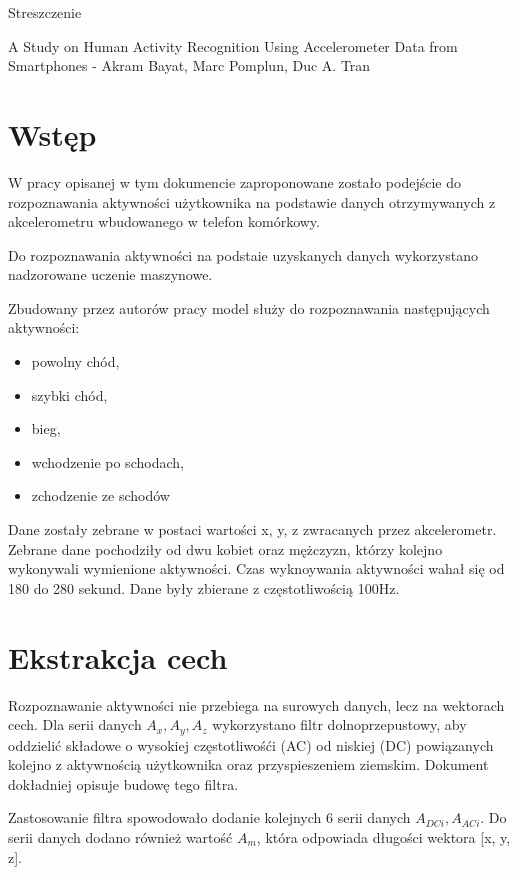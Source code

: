 \documentclass{article}
\begin{document}
\begin{center}
	\LARGE Streszczenie
\end{center}
\begin{center}
	{\Large A Study on Human Activity Recognition Using Accelerometer Data
		from Smartphones - Akram Bayat, Marc Pomplun, Duc A. Tran}
\end{center}

\section{Wstęp}
W pracy opisanej w tym dokumencie zaproponowane zostało podejście do rozpoznawania aktywności użytkownika
na podstawie danych otrzymywanych z akcelerometru wbudowanego w telefon komórkowy.

Do rozpoznawania aktywności na podstaie uzyskanych danych wykorzystano nadzorowane uczenie maszynowe.

Zbudowany przez autorów pracy model służy do rozpoznawania następujących aktywności:
\begin{itemize}
	\item powolny chód,
	\item szybki chód,
	\item bieg,
	\item wchodzenie po schodach,
	\item zchodzenie ze schodów
\end{itemize}

Dane zostały zebrane w postaci wartości x, y, z zwracanych przez akcelerometr.
Zebrane dane pochodziły od dwu kobiet oraz mężczyzn, którzy kolejno wykonywali wymienione aktywności. Czas wyknoywania aktywności wahał się od 180 do 280 sekund. Dane były zbierane z częstotliwością 100Hz.

\section{Ekstrakcja cech}

Rozpoznawanie aktywności nie przebiega na surowych danych, lecz na wektorach cech.
Dla serii danych $A_x, A_y, A_z$ wykorzystano filtr dolnoprzepustowy, aby oddzielić składowe o wysokiej częstotliwośći (AC) od niskiej (DC) powiązanych kolejno z aktywnością użytkownika oraz przyspieszeniem ziemskim. Dokument dokładniej opisuje budowę tego filtra.

Zastosowanie filtra spowodowało dodanie kolejnych 6 serii danych $A_{DCi}, A_{ACi}$.
Do serii danych dodano również wartość $A_m$, która odpowiada długości wektora [x, y, z].
\end{document}
